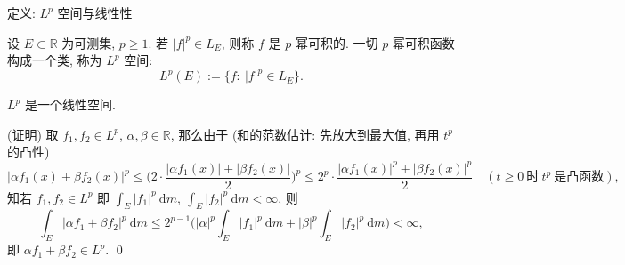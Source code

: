 
\begin{frame}{定义: $L^p$ 空间与线性性}

\begin{Def}[$L^p$ 空间]
设 $E \subset \mathbb{R}$ 为可测集, $p \geqslant 1$. 若 $|f|^p \in L_E$,
则称 $f$ 是 \alert{$p$ 幂可积}的. 一切 $p$ 幂可积函数构成一个类, 称为 $L^p$ 空间:
\[
L^p(E) := \big\{ f:\ |f|^p \in L_E \big\} .
\]
\end{Def}

\pause

\begin{thm}
$L^p$ 是一个线性空间.
\end{thm}

\startproof[bg=yellow, fg=red](证明)
取 $f_1, f_2 \in L^p$, $\alpha, \beta \in \mathbb{R}$, 那么由于
(和的范数估计: 先放大到最大值, 再用 $t^p$ 的凸性)
\[
\big| \alpha f_1(x) + \beta f_2(x) \big|^p
\leqslant \Big( 2 \cdot \frac{|\alpha f_1(x)| + |\beta f_2(x)|}{2} \Big)^{\!p}
\leqslant 2^p \cdot \frac{|\alpha f_1(x)|^p + |\beta f_2(x)|^p}{2}
\quad (t \geqslant 0\ \text{时}\ t^p\ \text{是凸函数}),
\]
知若 $f_1, f_2 \in L^p$ 即 $\int_E |f_1|^p ~ \mathrm{d} m,\ \int_E |f_2|^p ~ \mathrm{d} m < \infty$, 则
\[
\int_E \big| \alpha f_1 + \beta f_2 \big|^p ~ \mathrm{d} m
\leqslant 2^{p-1} \Big( |\alpha|^p \int_E |f_1|^p ~ \mathrm{d} m
+ |\beta|^p \int_E |f_2|^p ~ \mathrm{d} m \Big) < \infty ,
\]
即 $\alpha f_1 + \beta f_2 \in L^p$.
\qed

\end{frame}


